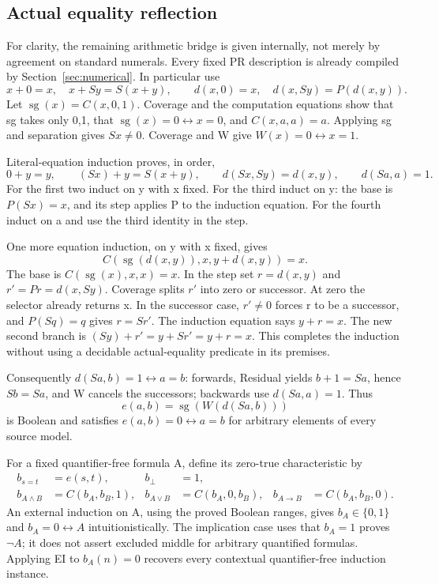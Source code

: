 \subsection{Actual equality reflection}

For clarity, the remaining arithmetic bridge is given internally,
not merely by agreement on standard numerals. Every fixed PR description
is already compiled by Section~\ref{sec:numerical}. In particular use
\[
 x+0=x,\quad x+Sy=S(x+y),\qquad
 d(x,0)=x,\quad d(x,Sy)=P(d(x,y)).
\]
Let $\operatorname{sg}(x)=C(x,0,1)$. Coverage and the computation
equations show that sg takes only 0,1, that
$\operatorname{sg}(x)=0\leftrightarrow x=0$, and $C(x,a,a)=a$.
Applying sg and separation gives $Sx\ne0$. Coverage and W give
$W(x)=0\leftrightarrow x=1$.

Literal-equation induction proves, in order,
\[
 0+y=y,\qquad (Sx)+y=S(x+y),\qquad
 d(Sx,Sy)=d(x,y),\qquad d(Sa,a)=1.
\]
For the first two induct on y with x fixed. For the third induct on y:
the base is $P(Sx)=x$, and its step applies P to the induction equation.
For the fourth induct on a and use the third identity in the step.

One more equation induction, on y with x fixed, gives
\[
        C(\operatorname{sg}(d(x,y)),x,y+d(x,y))=x. \tag{Residual}
\]
The base is $C(\operatorname{sg}(x),x,x)=x$. In the step set
$r=d(x,y)$ and $r'=Pr=d(x,Sy)$. Coverage splits $r'$ into zero
or successor. At zero the selector already returns x. In the successor
case, $r'\ne0$ forces r to be a successor, and $P(Sq)=q$ gives
$r=Sr'$. The induction equation says $y+r=x$. The new second branch
is $(Sy)+r'=y+Sr'=y+r=x$. This completes the induction without
using a decidable actual-equality predicate in its premises.

Consequently $d(Sa,b)=1\leftrightarrow a=b$: forwards, Residual yields
$b+1=Sa$, hence $Sb=Sa$, and W cancels the successors; backwards
use $d(Sa,a)=1$. Thus
\[
                 e(a,b)=\operatorname{sg}(W(d(Sa,b)))
\]
is Boolean and satisfies $e(a,b)=0\leftrightarrow a=b$ for arbitrary
elements of every source model.

For a fixed quantifier-free formula A, define its zero-true
characteristic by
\begin{align*}
 b_{s=t}&=e(s,t),&b_\bot&=1,\\
 b_{A\wedge B}&=C(b_A,b_B,1),&
 b_{A\vee B}&=C(b_A,0,b_B),&
 b_{A\to B}&=C(b_A,b_B,0).
\end{align*}
An external induction on A, using the proved Boolean ranges, gives
$b_A\in\{0,1\}$ and $b_A=0\leftrightarrow A$ intuitionistically.
The implication case uses that $b_A=1$ proves $\neg A$; it does not
assert excluded middle for arbitrary quantified formulas. Applying EI
to $b_A(n)=0$ recovers every contextual quantifier-free induction instance.


